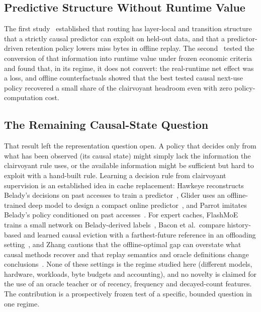 \documentclass[11pt]{article}
\theoremstyle{plain}
\theoremstyle{definition}
\begin{document}
\subsection{Predictive Structure Without Runtime Value}
\label{sec:bg-pred}
The first study~\cite{argine2paper} established that routing has layer-local and transition structure that a strictly causal predictor can exploit on held-out data, and that a predictor-driven retention policy lowers miss bytes in offline replay. The second~\cite{argine3paper} tested the conversion of that information into runtime value under frozen economic criteria and found that, in its regime, it does not convert: the real-runtime net effect was a loss, and offline counterfactuals showed that the best tested causal next-use policy recovered a small share of the clairvoyant headroom even with zero policy-computation cost.

\subsection{The Remaining Causal-State Question}
\label{sec:bg-question}
That result left the representation question open. A policy that decides only from what has been observed (its causal state) might simply lack the information the clairvoyant rule uses, or the available information might be sufficient but hard to exploit with a hand-built rule. Learning a decision rule from clairvoyant supervision is an established idea in cache replacement: Hawkeye reconstructs Belady's decisions on past accesses to train a predictor~\cite{hawkeye2016}, Glider uses an offline-trained deep model to design a compact online predictor~\cite{glider2019}, and Parrot imitates Belady's policy conditioned on past accesses~\cite{parrot2020}. For expert caches, FlashMoE trains a small network on Belady-derived labels~\cite{flashmoe2026}, Bacon et al.\ compare history-based and learned causal eviction with a farthest-future reference in an offloading setting~\cite{bacon2026fewer}, and Zhang cautions that the offline-optimal gap can overstate what causal methods recover and that replay semantics and oracle definitions change conclusions~\cite{zhang2026reproducible}. None of these settings is the regime studied here (different models, hardware, workloads, byte budgets and accounting), and no novelty is claimed for the use of an oracle teacher or of recency, frequency and decayed-count features. The contribution is a prospectively frozen test of a specific, bounded question in one regime.

\end{document}
